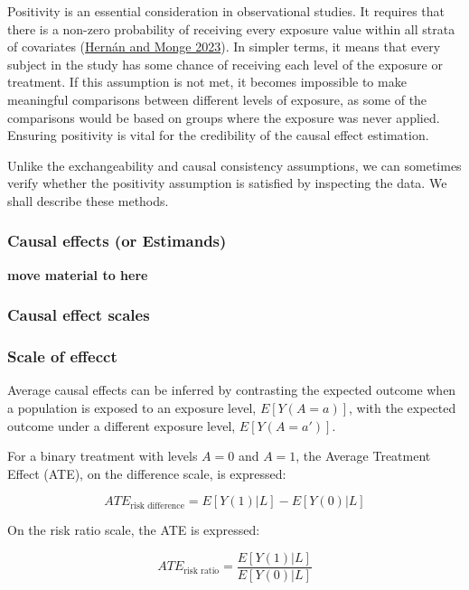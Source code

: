 \documentclass[
  singlecolumn]{article}
\begin{document}
Positivity is an essential consideration in observational studies. It
requires that there is a non-zero probability of receiving every
exposure value within all strata of covariates
(\protect\hyperlink{ref-hernuxe1n2023}{Hernán and Monge 2023}). In
simpler terms, it means that every subject in the study has some chance
of receiving each level of the exposure or treatment. If this assumption
is not met, it becomes impossible to make meaningful comparisons between
different levels of exposure, as some of the comparisons would be based
on groups where the exposure was never applied. Ensuring positivity is
vital for the credibility of the causal effect estimation.

Unlike the exchangeability and causal consistency assumptions, we can
sometimes verify whether the positivity assumption is satisfied by
inspecting the data. We shall describe these methods.

\hypertarget{causal-effects-or-estimands}{%
\subsubsection{Causal effects (or
Estimands)}\label{causal-effects-or-estimands}}

\textbf{move material to here}

\hypertarget{causal-effect-scales}{%
\subsubsection{Causal effect scales}\label{causal-effect-scales}}

\hypertarget{scale-of-effecct}{%
\subsubsection{Scale of effecct}\label{scale-of-effecct}}

Average causal effects can be inferred by contrasting the expected
outcome when a population is exposed to an exposure level,
\(E[Y(A = a)]\), with the expected outcome under a different exposure
level, \(E[Y(A=a')]\).

For a binary treatment with levels \(A=0\) and \(A=1\), the Average
Treatment Effect (ATE), on the difference scale, is expressed:

\[ATE_{\text{risk difference}} = E[Y(1)|L] - E[Y(0)|L]\]

On the risk ratio scale, the ATE is expressed:

\[ATE_{\text{risk ratio}} = \frac{E[Y(1)|L]}{E[Y(0)|L]}\]
\end{document}
